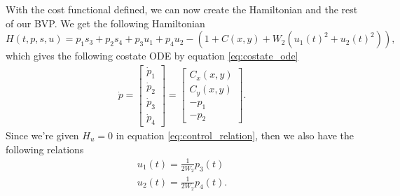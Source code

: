 With the cost functional defined, we can now create the Hamiltonian and the rest of our BVP.
We get the following Hamiltonian
\begin{equation}\label{eq:ex-Hamiltonian}
    H(t,p,s,u) = p_1s_3 + p_2s_4 + p_3u_1 + p_4u_2 - \left(1 + C(x,y) + W_2\left(u_1(t)^2+u_2(t)^2\right) \right),
\end{equation}
which gives the following costate ODE by equation \ref{eq:costate_ode}
\begin{equation}\label{eq:ex-costate-odes}
    \begin{aligned}
        \dot{p} =
        \begin{bmatrix}
            \dot{p}_1 \\
            \dot{p}_2 \\
            \dot{p}_3 \\
            \dot{p}_4
        \end{bmatrix} =
        \begin{bmatrix}
            C_x(x,y) \\
            C_y(x,y) \\
            -p_1 \\
            -p_2
        \end{bmatrix}.
    \end{aligned}
\end{equation}
Since we're given $H_u = 0$ in equation \ref{eq:control_relation}, then we also have the following relations
\begin{equation}\label{eq:ex-equality-constraints}
    \begin{aligned}
    u_1(t) = \frac{1}{2W_2}p_3(t) \\
    u_2(t) = \frac{1}{2W_2}p_4(t).
    \end{aligned}
\end{equation}


